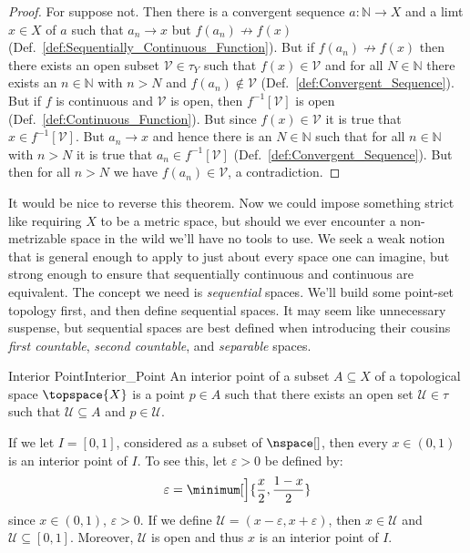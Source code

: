         \begin{proof}
            For suppose not. Then there is a convergent sequence
            $a:\mathbb{N}\rightarrow{X}$ and a limt $x\in{X}$ of $a$ such
            that $a_{n}\rightarrow{x}$ but $f(a_{n})\not\rightarrow{f}(x)$
            (Def.~\ref{def:Sequentially_Continuous_Function}). But if
            $f(a_{n})\not\rightarrow{f}(x)$ then there exists an open subset
            $\mathcal{V}\in\tau_{Y}$ such that $f(x)\in\mathcal{V}$ and for
            all $N\in\mathbb{N}$ there exists an $n\in\mathbb{N}$ with
            $n>N$ and $f(a_{n})\notin\mathcal{V}$
            (Def.~\ref{def:Convergent_Sequence}). But if $f$ is continuous
            and $\mathcal{V}$ is open, then $f^{\minus{1}}[\mathcal{V}]$ is
            open (Def.~\ref{def:Continuous_Function}). But since
            $f(x)\in\mathcal{V}$ it is true that
            $x\in{f}^{\minus{1}}[\mathcal{V}]$. But $a_{n}\rightarrow{x}$
            and hence there is an $N\in\mathbb{N}$ such that for all
            $n\in\mathbb{N}$ with $n>N$ it is true that
            $a_{n}\in{f}^{\minus{1}}[\mathcal{V}]$
            (Def.~\ref{def:Convergent_Sequence}). But then for all $n>N$
            we have $f(a_{n})\in\mathcal{V}$, a contradiction.
        \end{proof}
        It would be nice to reverse this theorem. Now we could impose
        something strict like requiring $X$ to be a metric space, but should
        we ever encounter a non-metrizable space in the wild we'll have no
        tools to use. We seek a weak notion that is general enough to apply
        to just about every space one can imagine, but strong enough to
        ensure that sequentially continuous and continuous are equivalent.
        The concept we need is \textit{sequential} spaces. We'll build some
        point-set topology first, and then define sequential spaces. It may
        seem like unnecessary suspense, but sequential spaces are best
        defined when introducing their cousins \textit{first countable},
        \textit{second countable}, and \textit{separable} spaces.
        \begin{fdefinition}{Interior Point}{Interior_Point}
            An interior point of a subset $A\subseteq{X}$ of a topological
            space $\topspace{X}$ is a point $p\in{A}$ such that there exists
            an open set $\mathcal{U}\in\tau$ such that
            $\mathcal{U}\subseteq{A}$ and $p\in\mathcal{U}$.
        \end{fdefinition}
        \begin{example}
            If we let $I=[0,1]$, considered as a subset of $\nspace[]$, then
            every $x\in(0,1)$ is an interior point of $I$. To see this, let
            $\varepsilon>0$ be defined by:
            \begin{equation}
                \varepsilon=\minimum[\Big]{\frac{x}{2},\frac{1-x}{2}}
            \end{equation}
            since $x\in(0,1)$, $\varepsilon>0$. If we define
            $\mathcal{U}=(x-\varepsilon,x+\varepsilon)$, then
            $x\in\mathcal{U}$ and $\mathcal{U}\subseteq[0,1]$. Moreover,
            $\mathcal{U}$ is open and thus $x$ is an interior point of $I$.
        \end{example}
